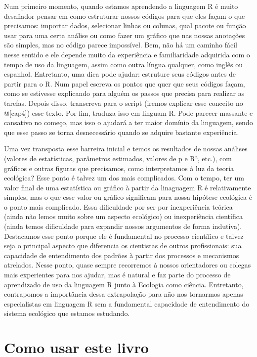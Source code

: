 \documentclass[
]{book}
\begin{document}
Num primeiro momento, quando estamos aprendendo a linguagem R é muito desafiador pensar em como estruturar nossos códigos para que eles façam o que precisamos: importar dados, selecionar linhas ou colunas, qual pacote ou função usar para uma certa análise ou como fazer um gráfico que nas nossas anotações são simples, mas no código parece impossível. Bem, não há um caminho fácil nesse sentido e ele depende muito da experiência e familiaridade adquirida com o tempo de uso da linguagem, assim como outra língua qualquer, como inglês ou espanhol. Entretanto, uma dica pode ajudar: estruture seus códigos antes de partir para o R. Num papel escreva os pontos que quer que seus códigos façam, como se estivesse explicando para alguém os passos que precisa para realizar as tarefas. Depois disso, transcreva para o script (iremos explicar esse conceito no @{[}cap4{]}) esse texto. Por fim, traduza isso em linguam R. Pode parecer massante e cansativo no começo, mas isso o ajudará a ter maior domínio da linguagem, sendo que esse passo se torna desnecessário quando se adquire bastante experiência.

Uma vez transposta esse barreira inicial e temos os resultados de nossas análises (valores de estatísticas, parâmetros estimados, valores de p e R², etc.), com gráficos e outras figuras que precisamos, como interpretamos à luz da teoria ecológica? Esse ponto é talvez um dos mais complicados. Com o tempo, ter um valor final de uma estatística ou gráfico à partir da linaguagem R é relativamente simples, mas o que esse valor ou gráfico significam para nossa hipótese ecológica é o ponto mais complicado. Essa dificuldade por ser por inexperiência teórica (ainda não lemos muito sobre um aspecto ecológico) ou inexperiência científica (ainda temos dificuldade para expandir nossos argumentos de forma indutiva). Destacamos esse ponto porque ele é fundamental no processo científico e talvez seja o principal aspecto que diferencia os cientistas de outros profissionais: sua capacidade de entendimento dos padrões à partir dos processos e mecanismos atrelados. Nesse ponto, quase sempre recorremos à nossos orientadores ou colegas mais experientes para nos ajudar, mas é natural e faz parte do processo de aprendizado de uso da linguagem R junto à Ecologia como ciência. Entretanto, contrapomos a importância dessa extrapolação para não nos tornarmos apenas especialistas em linguagem R sem a fundamental capacidade de entendimento do sistema ecológico que estamos estudando.

\hypertarget{como-usar-este-livro}{%
\section{Como usar este livro}\label{como-usar-este-livro}}
\end{document}
